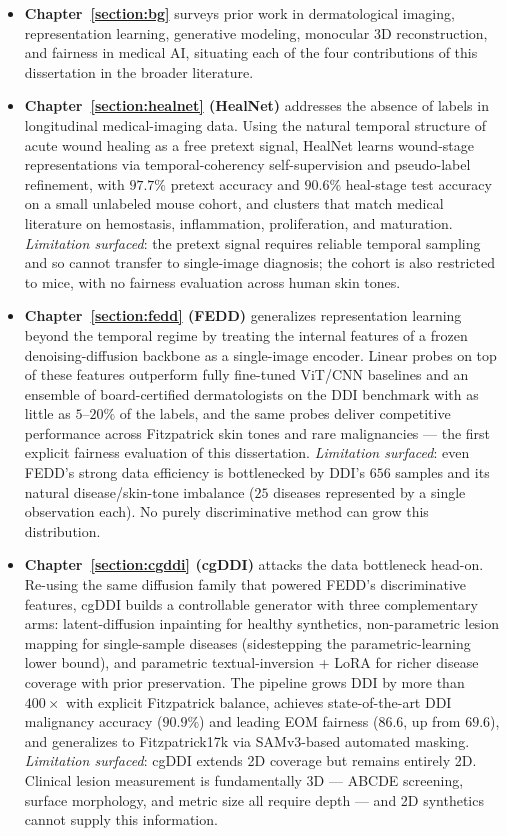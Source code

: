 \documentclass[11pt]{ucthesis}
\begin{document}
\begin{itemize}
  \item \textbf{Chapter~\ref{section:bg}} surveys prior work in dermatological imaging, representation learning, generative modeling, monocular 3D reconstruction, and fairness in medical AI, situating each of the four contributions of this dissertation in the broader literature.

  \item \textbf{Chapter~\ref{section:healnet} (HealNet)} addresses the absence of labels in longitudinal medical-imaging data. Using the natural temporal structure of acute wound healing as a free pretext signal, HealNet learns wound-stage representations via temporal-coherency self-supervision and pseudo-label refinement, with $97.7\%$ pretext accuracy and $90.6\%$ heal-stage test accuracy on a small unlabeled mouse cohort, and clusters that match medical literature on hemostasis, inflammation, proliferation, and maturation. \emph{Limitation surfaced}: the pretext signal requires reliable temporal sampling and so cannot transfer to single-image diagnosis; the cohort is also restricted to mice, with no fairness evaluation across human skin tones.

  \item \textbf{Chapter~\ref{section:fedd} (FEDD)} generalizes representation learning beyond the temporal regime by treating the internal features of a frozen denoising-diffusion backbone as a single-image encoder. Linear probes on top of these features outperform fully fine-tuned ViT/CNN baselines and an ensemble of board-certified dermatologists on the DDI benchmark with as little as $5$--$20\%$ of the labels, and the same probes deliver competitive performance across Fitzpatrick skin tones and rare malignancies --- the first explicit fairness evaluation of this dissertation. \emph{Limitation surfaced}: even FEDD's strong data efficiency is bottlenecked by DDI's $656$ samples and its natural disease/skin-tone imbalance ($25$ diseases represented by a single observation each). No purely discriminative method can grow this distribution.

  \item \textbf{Chapter~\ref{section:cgddi} (cgDDI)} attacks the data bottleneck head-on. Re-using the same diffusion family that powered FEDD's discriminative features, cgDDI builds a controllable generator with three complementary arms: latent-diffusion inpainting for healthy synthetics, non-parametric lesion mapping for single-sample diseases (sidestepping the parametric-learning lower bound), and parametric textual-inversion + LoRA for richer disease coverage with prior preservation. The pipeline grows DDI by more than $400\times$ with explicit Fitzpatrick balance, achieves state-of-the-art DDI malignancy accuracy ($90.9\%$) and leading EOM fairness ($86.6$, up from $69.6$), and generalizes to Fitzpatrick17k via SAMv3-based automated masking. \emph{Limitation surfaced}: cgDDI extends 2D coverage but remains entirely 2D. Clinical lesion measurement is fundamentally 3D --- ABCDE screening, surface morphology, and metric size all require depth --- and 2D synthetics cannot supply this information.


\end{itemize}
\end{document}
